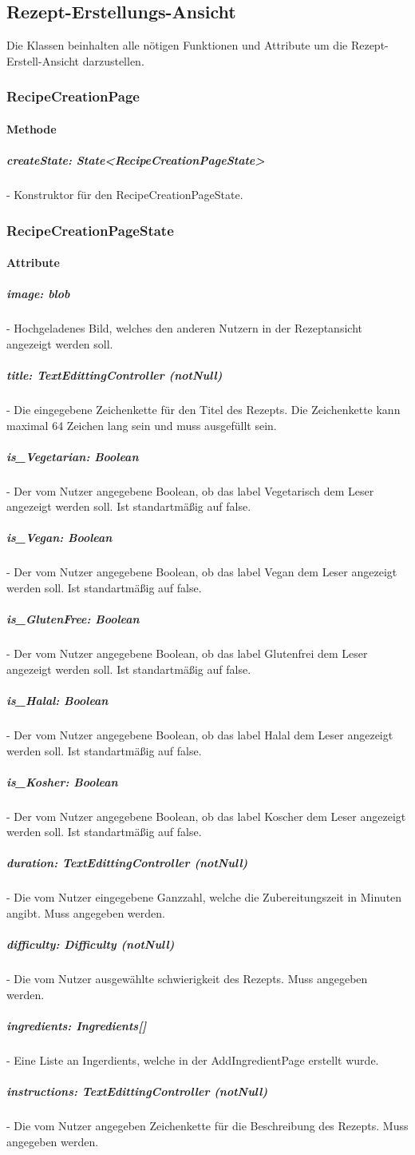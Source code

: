 \documentclass[parskip=full]{scrartcl}
\begin{document}
        \newpage

    \subsection{Rezept-Erstellungs-Ansicht}
        Die Klassen beinhalten alle nötigen Funktionen und Attribute um die Rezept-Erstell-Ansicht darzustellen.

        \subsubsection{RecipeCreationPage}
            \paragraph*{Methode}
                \subparagraph*{createState: State<RecipeCreationPageState>} - Konstruktor für den RecipeCreationPageState.

        \subsubsection{RecipeCreationPageState}
            \paragraph*{Attribute}
                \subparagraph*{image: blob} - Hochgeladenes Bild, welches den anderen Nutzern in der Rezeptansicht angezeigt werden soll.
                \subparagraph*{title: TextEdittingController (notNull)} - Die eingegebene Zeichenkette für den Titel des Rezepts. Die Zeichenkette kann maximal 64 Zeichen lang sein und muss ausgefüllt sein.
                \subparagraph*{is\_Vegetarian: Boolean} - Der vom Nutzer angegebene Boolean, ob das \gls{label} Vegetarisch dem Leser angezeigt werden soll. Ist standartmäßig auf false.
                \subparagraph*{is\_Vegan: Boolean} - Der vom Nutzer angegebene Boolean, ob das \gls{label} Vegan dem Leser angezeigt werden soll. Ist standartmäßig auf false.
                \subparagraph*{is\_GlutenFree: Boolean} - Der vom Nutzer angegebene Boolean, ob das \gls{label} Glutenfrei dem Leser angezeigt werden soll.  Ist standartmäßig auf false.
                \subparagraph*{is\_Halal: Boolean} - Der vom Nutzer angegebene Boolean, ob das \gls{label} Halal dem Leser angezeigt werden soll.  Ist standartmäßig auf false.
                \subparagraph*{is\_Kosher: Boolean} - Der vom Nutzer angegebene Boolean, ob das \gls{label} Koscher dem Leser angezeigt werden soll.  Ist standartmäßig auf false.
                \subparagraph*{duration: TextEdittingController (notNull)} - Die vom Nutzer eingegebene Ganzzahl, welche die Zubereitungszeit in Minuten angibt. Muss angegeben werden.
                \subparagraph*{difficulty: Difficulty (notNull)} - Die vom Nutzer ausgewählte \gls{schwierigkeit} des Rezepts. Muss angegeben werden.
                \subparagraph*{ingredients: Ingredients[]} - Eine Liste an Ingerdients, welche in der AddIngredientPage erstellt wurde.
                \subparagraph*{instructions: TextEdittingController (notNull)} - Die vom Nutzer angegeben Zeichenkette für die Beschreibung des Rezepts. Muss angegeben werden.
\end{document}

